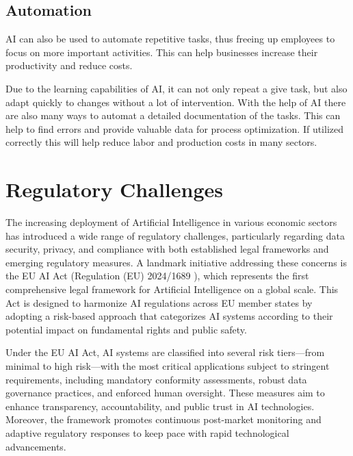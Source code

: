 \cite{AiDataAnalysis}

\subsection{Automation}
\label{subsec:automation}

AI can also be used to automate repetitive tasks, thus freeing up employees to focus on more important activities.
This can help businesses increase their productivity and reduce costs.

Due to the learning capabilities of AI, it can not only repeat a give task, but also adapt quickly to changes without a lot of intervention.
With the help of AI there are also many ways to automat a detailed documentation of the tasks. This can help to find errors and provide valuable data for process optimization. 
If utilized correctly this will help reduce labor and production costs in many sectors. 

\cite{AiAutomation}

\section{Regulatory Challenges}
\label{sec:regulatory-challanges}

The increasing deployment of Artificial Intelligence in various economic sectors has introduced a wide range of regulatory challenges, particularly regarding data security, privacy, and compliance with both established legal frameworks and emerging regulatory measures. A landmark initiative addressing these concerns is the EU AI Act (Regulation (EU) 2024/1689 \cite{EU-AI-Act-text}), which represents the first comprehensive legal framework for Artificial Intelligence on a global scale. This Act is designed to harmonize AI regulations across EU member states by adopting a risk-based approach that categorizes AI systems according to their potential impact on fundamental rights and public safety.

Under the EU AI Act, AI systems are classified into several risk tiers—from minimal to high risk—with the most critical applications subject to stringent requirements, including mandatory conformity assessments, robust data governance practices, and enforced human oversight. These measures aim to enhance transparency, accountability, and public trust in AI technologies. Moreover, the framework promotes continuous post-market monitoring and adaptive regulatory responses to keep pace with rapid technological advancements.

